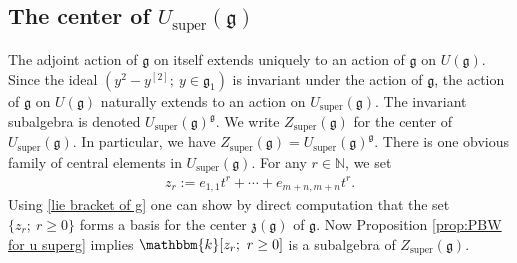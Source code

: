 \documentclass[12pt,reqno]{amsart}
\newcommand{\NN}{\mathbb{N}}
\newcommand{\fg}{\mathfrak{g}}
\newcommand{\kk}{\mathbbm{k}}
\newcommand{\fz}{\mathfrak{z}}
\DeclareMathOperator{\super}{super}
\numberwithin{equation}{section}
\theoremstyle{Theorem}
\theoremstyle{remark}
\numberwithin{equation}{section}
\begin{document}
\subsection{The center of $U_{\super}(\fg)$}
The adjoint action of $\fg$ on itself extends uniquely to an action of $\fg$ on $U(\fg)$.
Since the ideal $(y^2-y^{[2]};~y\in \fg_1)$ is invariant under the action of $\fg$, the action of $\fg$ on $U(\fg)$ naturally extends to an action on $U_{\super}(\fg)$. The invariant subalgebra is denoted $U_{\super}(\fg)^{\fg}$. 
We write $Z_{\super}(\fg)$ for the center of $U_{\super}(\fg)$. 
In particular, we have $Z_{\super}(\fg)=U_{\super}(\fg)^{\fg}$.
There is one obvious family of central elements in $U_{\super}(\fg)$.
For any $r\in\NN$, we set 
\begin{align}\label{zr}
z_r:=e_{1,1}t^r+\cdots +e_{m+n,m+n}t^r.  
\end{align}
Using \eqref{lie bracket of g} one can show by direct computation that the set $\{z_r;~r\geq 0\}$ forms a basis for the center $\fz(\fg)$ of $\fg$.
Now Proposition \ref{prop:PBW for u superg} implies $\kk[z_r;~r\geq 0]$ is a subalgebra of $Z_{\super}(\fg)$.
\end{document}
